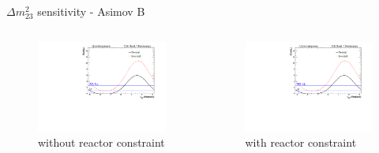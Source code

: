 \documentclass{beamer}
\newcommand{\dmsqtwothree}{$\Delta m^2_{23}$\xspace}
\begin{document}
\begin{frame}{\dmsqtwothree sensitivity - Asimov B}
	\centering
	\begin{columns}
		\begin{column}{0.5\paperwidth}
			\begin{figure}
				\includegraphics[trim={0cm 0cm 0cm 0cm}, clip, scale=0.33] {images/sensitivity/dmsq23_global_t2k}
				\caption*{without reactor constraint}
			\end{figure}
		\end{column}
		\begin{column}{0.5\paperwidth}
			\begin{figure}
				\includegraphics[trim={0cm 0cm 0cm 0cm}, clip, scale=0.33] {images/sensitivity/dmsq23_global_t2k}
				\caption*{with reactor constraint}
			\end{figure}
		\end{column}
	\end{columns}
\end{frame}
\end{document}
